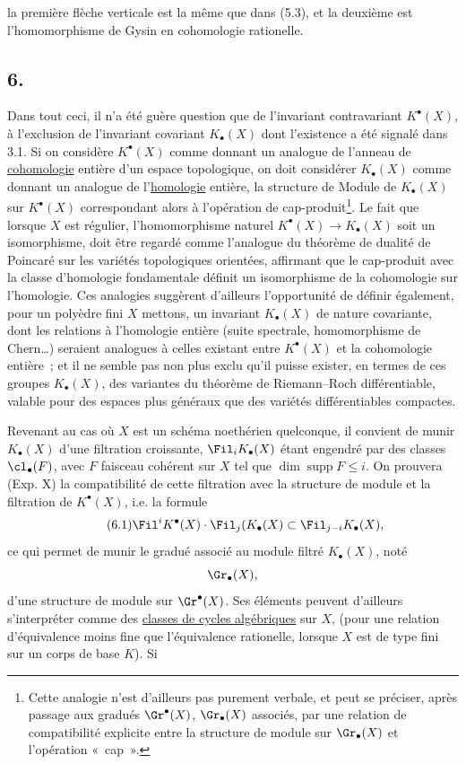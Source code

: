 la
premi\`ere fl\`eche verticale est la m\^eme que dans (5.3), et la deuxi\`eme est l'homomorphisme de Gysin en cohomologie rationelle.

\subsection*{6.}
Dans tout ceci, il n'a \'et\'e gu\`ere question que de l'invariant contravariant $K^\bullet(X)$, \`a l'exclusion de l'invariant covariant $K_\bullet(X)$ dont l'existence a \'et\'e signal\'e dans 3.1. Si on consid\`ere $K^\bullet(X)$ comme donnant un analogue de l'anneau de \underline{cohomologie} enti\`ere d'un espace topologique, on doit consid\'erer $K_\bullet(X)$ comme donnant un analogue de l'\underline{homologie} enti\`ere, la structure de Module de $K_\bullet(X)$ sur $K^\bullet(X)$ correspondant alors \`a l'op\'eration de cap-produit\footnote{Cette analogie n'est d'ailleurs pas purement verbale, et peut se pr\'eciser, apr\`es passage aux gradu\'es $\Gr^\bullet(X)$, $\Gr_\bullet(X)$ associ\'es, par une relation de compatibilit\'e explicite entre la structure de module sur $\Gr_\bullet(X)$ et l'op\'eration «~cap~».}. Le fait que lorsque $X$ est r\'egulier, l'homomorphisme naturel $K^\bullet(X)\to K_\bullet(X)$ soit un isomorphisme, doit \^etre regard\'e comme l'analogue du th\'eor\`eme de dualit\'e de Poincar\'e sur les vari\'et\'es topologiques orient\'ees, affirmant que le cap-produit avec la classe d'homologie fondamentale d\'efinit un isomorphisme de la cohomologie sur l'homologie. Ces analogies sugg\`erent d'ailleurs l'opportunit\'e de d\'efinir \'egalement, pour un poly\`edre fini $X$ mettons, un invariant $K_\bullet(X)$ de nature covariante, dont les relations \`a l'homologie enti\`ere (suite spectrale, homomorphisme de Chern\dots) seraient analogues \`a celles existant entre $K^\bullet(X)$ et la cohomologie enti\`ere~; et il ne semble pas non plus exclu qu'il puisse exister, en termes de ces groupes $K_\bullet(X)$, des variantes du th\'eor\`eme de Riemann--Roch diff\'erentiable, valable pour des espaces plus g\'en\'eraux que des vari\'et\'es diff\'erentiables compactes.

Revenant au cas o\`u $X$ est un sch\'ema noeth\'erien quelconque, il convient de munir $K_\bullet(X)$ d'une filtration croissante, $\Fil_iK_\bullet(X)$ \'etant engendr\'e par des classes $\cl_\bullet(F)$, avec $F$ faisceau coh\'erent sur $X$ tel que $\dim \operatorname{supp}F\le i$. On prouvera (Exp. X) la compatibilit\'e de cette filtration avec la structure de module et la filtration de $K^\bullet(X)$, i.e. la formule
\begin{equation}\tag{6.1}
\Fil^iK^\bullet(X)\cdot \Fil_j(K_\bullet(X)\subset \Fil_{j-i}K_\bullet(X),
\end{equation}
ce qui permet de munir le gradu\'e associ\'e au module filtr\'e $K_\bullet(X)$, not\'e
\[
\Gr_\bullet(X),
\]
d'une structure de module sur $\Gr^\bullet(X)$. Ses \'el\'ements peuvent d'ailleurs s'interpr\'eter comme des \uline{classes de cycles alg\'ebriques} sur $X$, (pour une relation d'\'equivalence moins fine que l'\'equivalence rationelle, lorsque $X$ est de type fini sur un corps de base $K$). Si
